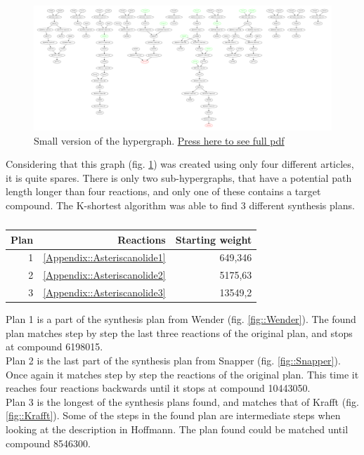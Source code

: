 \documentclass[a4paper,10pt,titlepage]{paper}
\begin{document}
\begin{figure}
\centering
\includegraphics[scale=0.17, angle=90]{Synteseplaner/Asteriscanolide/Output.pdf}
\caption{Small version of the hypergraph. \href{Synteseplaner/Asteriscanolide/Output.pdf}{Press here to see full pdf}}
\label{fig::AsteriscanolideGraph}
\end{figure}

Considering that this graph (fig. \ref{fig::AsteriscanolideGraph}) was created using only four different articles, it is quite spares. There is only two sub-hypergraphs, that have a potential path length longer than four reactions, and only one of these contains a target compound. The K-shortest algorithm was able to find 3 different synthesis plans. 

\begin{table}[H]
\centering
\begin{tabular}{|r|r|r|}
\hline
Plan & Reactions & Starting weight \\ \hline
1 & \ref{Appendix::Asteriscanolide1} & 649,346 \\\hline
2 & \ref{Appendix::Asteriscanolide2} & 5175,63 \\\hline
3 & \ref{Appendix::Asteriscanolide3} & 13549,2 \\\hline
\end{tabular}
\caption{}
\end{table}
Plan 1 is a part of the synthesis plan from Wender (fig. \ref{fig::Wender}). The found plan matches step by step the last three reactions of the original plan, and stops at compound 6198015.\\
Plan 2 is the last part of the synthesis plan from Snapper (fig. \ref{fig::Snapper}). Once again it matches step by step the reactions of the original plan. This time it reaches four reactions backwards until it stops at compound 10443050.\\
Plan 3 is the longest of the synthesis plans found, and matches that of Krafft (fig. \ref{fig::Krafft}). Some of the steps in the found plan are intermediate steps when looking at the description in Hoffmann. The plan found could be matched until compound 8546300.\\
\end{document}
